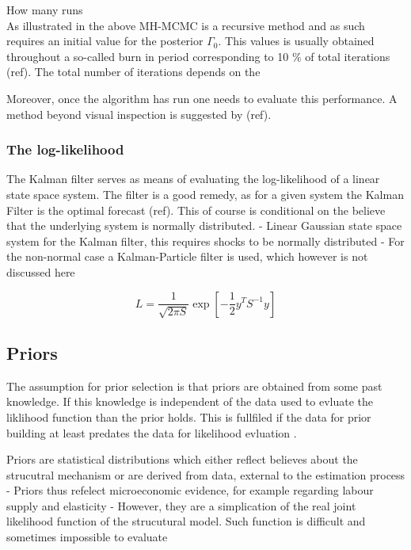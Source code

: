 \documentclass[11pt,a4paper,english]{article} %
\begin{document}
	How many runs\\
	

	As illustrated in the above MH-MCMC is a recursive method and as such requires an initial value for the posterior $\Gamma_0$. This values is usually obtained throughout a so-called burn in period corresponding to 10 \% of total iterations (ref). The total number of iterations depends on the 
	
	Moreover, once the algorithm has run one needs to evaluate this performance. A method beyond visual inspection is suggested by (ref).
	
	
	
	\subsubsection{The log-likelihood}
	The Kalman filter serves as means of evaluating the log-likelihood of a linear state space system. The filter is a good remedy, as for a given system the Kalman Filter is the optimal forecast (ref). This of course is conditional on the believe that the underlying system is normally distributed.
	- Linear Gaussian state space system for the Kalman filter, this requires shocks to be normally distributed \cite{herbst_bayesian_2014}
	- For the non-normal case a Kalman-Particle filter is used, which however is not discussed here
	
	\[
		L = \frac{1}{\sqrt{2 \pi S}} \exp [- \frac{1}{2} y^T S^{-1} y]
	\]
	
	
	
	
	
	
	
	\subsection{Priors}
	
	The assumption for prior selection is that priors are obtained from some past knowledge. If this knowledge is independent of the data used to evluate the liklihood function than the prior holds. This is fullfiled if the data for prior building at least predates the data for likelihood evluation \cite{herbst_bayesian_2014}.
	
	
	Priors are statistical distributions which either reflect believes about the strucutral mechanism or are derived from data, external to the estimation process \cite{del_negro_forming_2008}
	- Priors thus refelect microeconomic evidence, for example regarding labour supply and elasticity
	- However, they are a simplication of the real joint likelihood function of the strucutural model. Such function is difficult and sometimes impossible to evaluate
	
\end{document}
